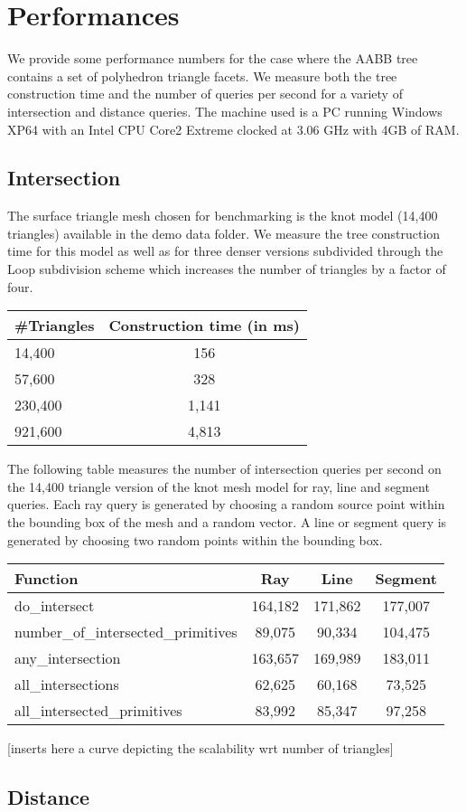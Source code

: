 \section{Performances}
\label{AABB_tree_section_performances}

We provide some performance numbers for the case where the AABB tree contains a set of polyhedron triangle facets. We measure both the tree construction time and the number of queries per second for a variety of intersection and distance queries. The machine used is a PC running Windows XP64 with an Intel CPU Core2 Extreme clocked at 3.06 GHz with 4GB of RAM.

\subsection{Intersection}

The surface triangle mesh chosen for benchmarking is the knot model (14,400 triangles) available in the demo data folder. We measure the tree construction time for this model as well as for three denser versions subdivided through the Loop subdivision scheme which increases the number of triangles by a factor of four.

\begin{tabular}{|l|c|}
  \hline
  #Triangles & Construction time (in ms)\\
  \hline
   14,400 &   156 \\
   57,600 &   328 \\
  230,400 & 1,141 \\
  921,600 & 4,813 \\
  \hline
\end{tabular}

The following table measures the number of intersection queries per second on the 14,400 triangle version of the knot mesh model for ray, line and segment queries. Each ray query is generated by choosing a random source point within the bounding box of the mesh and a random vector. A line or segment query is generated by choosing two random points within the bounding box.

\begin{tabular}{|l|c|c|c|}
  \hline
  Function                            & Ray     & Line    & Segment \\
  \hline
  do\_intersect                       & 164,182 & 171,862 & 177,007  \\
  number\_of\_intersected\_primitives &  89,075 &  90,334 & 104,475  \\
  any\_intersection                   & 163,657 & 169,989 & 183,011  \\
  all\_intersections                  &  62,625 &  60,168 &  73,525  \\
  all\_intersected\_primitives        &  83,992 &  85,347 &  97,258  \\
  \hline
\end{tabular}

[inserts here a curve depicting the scalability wrt number of triangles]

\subsection{Distance}


